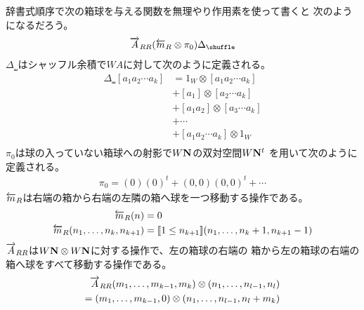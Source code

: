 	\begin{todo}[列挙を作用素で書く]\label{todo:列挙を作用素で書く} %
		辞書式順序で次の箱球を与える関数を無理やり作用素を使って書くと
		次のようになるだろう。
		\begin{equation*}\begin{split} %
			\uer{A}_{RR}(\uel{m}_R\otimes\pi_0)\Delta_\shuffle
		\end{split}\end{equation*} %
		$\Delta_\shuffle$はシャッフル余積で$WA$に対して次のように定義される。
		\begin{equation*}\begin{split} %
			\Delta_\shuffle[a_1a_2\cdots a_k] &= 1_W\otimes[a_1a_2\cdots a_k] \\
			&+ [a_1]\otimes[a_2\cdots a_k] \\
			&+ [a_1a_2]\otimes[a_3\cdots a_k] \\
			&+ \cdots \\
			&+ [a_1a_2\cdots a_k]\otimes1_W \\
		\end{split}\end{equation*} %
		$\pi_0$は球の入っていない箱球への射影で$W{\mathbf{N}}$の双対空間$W{\mathbf{N}}^t$
		を用いて次のように定義される。
		\begin{equation*}\begin{split} %
			\pi_0 = (0)(0)^t + (0,0)(0,0)^t + \cdots
		\end{split}\end{equation*} %
		$\overleftarrow{m}_R$は右端の箱から右端の左隣の箱へ球を一つ移動する操作である。
		\begin{equation*}\begin{split} %
			\uel{m}_R(n) &= 0 \\
			\uel{m}_R(n_1,\dots,n_k,n_{k+1})
			&= \jump{1\le n_{k+1}}(n_1,\dots,n_k+1,n_{k+1}-1)
		\end{split}\end{equation*} %
		$\overrightarrow{A}_{RR}$は$W{\mathbf{N}}\otimes W{\mathbf{N}}$に対する操作で、左の箱球の右端の
		箱から左の箱球の右端の箱へ球をすべて移動する操作である。
		\begin{equation*}\begin{split} %
			\uer{A}_{RR} (m_1,\dots,m_{k-1},m_k)\otimes(n_1,\dots,n_{l-1},n_l) \\
			= (m_1,\dots,m_{k-1},0)\otimes(n_1,\dots,n_{l-1},n_l+m_k)
		\end{split}\end{equation*} %
	\end{todo} %

